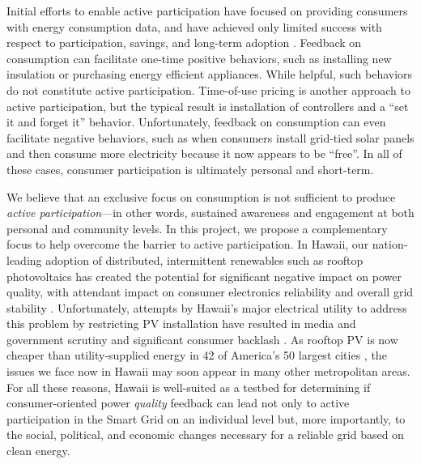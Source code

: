 Initial efforts to enable active participation have focused on providing consumers with energy consumption data, and have achieved only limited success with respect to participation, savings, and long-term adoption \cite{Darby06,Faruqui09,Foster2012}.  Feedback on consumption can facilitate one-time positive behaviors, such as installing new insulation or purchasing energy efficient appliances. While helpful, such behaviors do not constitute active participation.    Time-of-use pricing is another approach to active participation, but the typical result is installation of controllers and a ``set it and forget it'' behavior.  Unfortunately, feedback on consumption can even facilitate negative behaviors, such as when consumers install grid-tied solar panels and then consume more electricity because it now appears to be ``free''.  In all of these cases, consumer participation is ultimately personal and short-term.

We believe that an exclusive focus on consumption is not sufficient to produce {\em active participation}---in other words, sustained awareness and engagement at both personal and community levels. In this project, we propose a complementary focus to help overcome the barrier to active participation.  In Hawaii, our nation-leading adoption of distributed, intermittent renewables such as rooftop photovoltaics has created the potential for significant negative impact on power quality, with attendant impact on consumer electronics reliability and overall grid stability \cite{Rodriguez2010,Laskar2012}. Unfortunately, attempts by Hawaii's major electrical utility to address this problem by restricting PV installation have resulted in media and government scrutiny and significant consumer backlash \cite{Yonan2013,Zunin2013,Elston2013,Cocke2013,Cocke2012}. As rooftop PV is now cheaper than utility-supplied energy in 42 of America's 50 largest cities \cite{Kennerly2015},
the issues we face now in Hawaii may soon appear in many other metropolitan areas. For all these reasons, Hawaii is well-suited as a testbed for determining if consumer-oriented power {\em quality} feedback can lead not only to active participation in the Smart Grid on an individual level but, more importantly, to the social, political, and economic changes necessary for a reliable grid based on clean energy.

